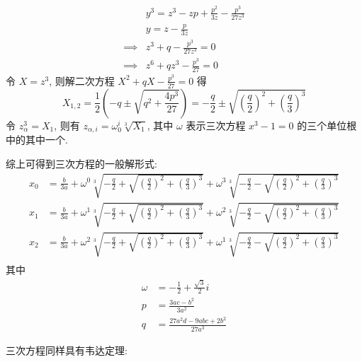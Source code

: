 \[ \begin{aligned}
    & y^3 = z^3 - zp + \frac{p^2}{3z} - \frac{p^3}{27z^3} \\
    & y = z - \frac{p}{3z} \\
    \implies & z^3 + q - \frac{p^3}{27z^3} = 0 \\
    \implies & z^6 + qz^3 - \frac{p^3}{27} = 0
\end{aligned} \]
令 $X = z^3$, 则解二次方程 $X^2 + qX - \frac{p^3}{27} = 0$ 得
\[
X_{1, 2} = \frac12 (-q \pm \sqrt{q^2 + \frac{4p^3}{27}}) = -\frac{q}{2} \pm \sqrt{(\frac{q}{2})^2 + (\frac{q}{3})^3}
\]
令 $z_\alpha^3 = X_1$, 则有 $z_{\alpha, i} = \omega^i_0 \sqrt[3]{X_1}$, 其中 $\omega$ 表示三次方程 $x^3-1 = 0$ 的三个单位根中的其中一个.

综上可得到三次方程的一般解形式:
\[ \begin{aligned}
    x_0 &= \frac{b}{3a} + \omega^{0} \sqrt[3]{-\frac{q}{2}+\sqrt{(\frac{q}{2})^2 + (\frac{q}{3})^3}} + \omega^{3} \sqrt[3]{-\frac{q}{2}-\sqrt{(\frac{q}{2})^2 + (\frac{q}{3})^3}} \\
    x_1 &= \frac{b}{3a} + \omega^{1} \sqrt[3]{-\frac{q}{2}+\sqrt{(\frac{q}{2})^2 + (\frac{q}{3})^3}} + \omega^{2} \sqrt[3]{-\frac{q}{2}-\sqrt{(\frac{q}{2})^2 + (\frac{q}{3})^3}} \\
    x_2 &= \frac{b}{3a} + \omega^{2} \sqrt[3]{-\frac{q}{2}+\sqrt{(\frac{q}{2})^2 + (\frac{q}{3})^3}} + \omega^{1} \sqrt[3]{-\frac{q}{2}-\sqrt{(\frac{q}{2})^2 + (\frac{q}{3})^3}} \\   
\end{aligned} \]
其中
\[ \begin{aligned}
\omega &= -\frac{1}{2} + \frac{\sqrt{3}}{2} i \\
p &= \frac{3ac-b^2}{3a^2} \\
q &= \frac{27a^2d - 9abc + 2b^2}{27a^3}
\end{aligned} \]

三次方程同样具有韦达定理:
\[ \begin{aligned}
\end{aligned} \]
\endinput